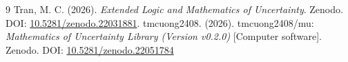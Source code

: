\documentclass[a4paper,12pt, twoside]{memoir}
\begin{document}
	\begin{thebibliography}{9}
		Tran, M. C. (2026). \textit{Extended Logic and Mathematics of Uncertainty}. Zenodo. DOI: \href{https://doi.org/10.5281/zenodo.22031881}{10.5281/zenodo.22031881}.
		tmcuong2408. (2026). tmcuong2408/mu: \textit{Mathematics of Uncertainty Library (Version v0.2.0)} [Computer software]. Zenodo.
		DOI: \href{https://doi.org/10.5281/zenodo.22051784}{10.5281/zenodo.22051784}
	\end{thebibliography}
	
\end{document}
